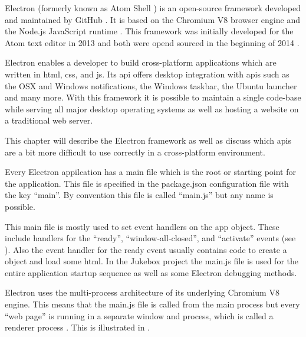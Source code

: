 

Electron (formerly known as Atom Shell \cite{atomShell}) is an open-source framework developed and maintained by GitHub \cite{electron}. It is based on the Chromium V8 browser engine \cite{chromium} and the Node.js JavaScript runtime \cite{nodejs}. This framework was initially developed for the Atom text editor \cite{atom} in 2013 and both were opend sourced in the beginning of 2014 \cite{aboutElectron}.

Electron enables a developer to build cross-platform applications which are written in \gls{html}, \gls{css}, and \gls{js}. Its \gls{api} offers desktop integration with \gls{api}s such as the OSX and Windows notifications, the Windows taskbar, the Ubuntu launcher and many more. With this framework it is possible to maintain a single code-base while serving all major desktop operating systems as well as hosting a website on a traditional web server.

This chapter will describe the Electron framework as well as discuss which \gls{api}s are a bit more difficult to use correctly in a cross-platform environment.


Every Electron appilcation has a main file which is the root or starting point for the application. This file is specified in the package.json configuration file with the key \enquote{main}. By convention this file is called \enquote{main.js} but any name is possible.


This main file is mostly used to set event handlers on the app object. These include handlers for the \enquote{ready}, \enquote{window-all-closed}, and \enquote{activate} events (see ). Also the event handler for the ready event usually contains code to create a  object and load some \gls{html}. In the Jukebox project the main.js file is used for the entire application startup sequence as well as some Electron debugging methods.


Electron uses the multi-process architecture of its underlying Chromium V8 engine. This means that the main.js file is called from the main process but every \enquote{web page} is running in a separate window and process, which is called a renderer process \cite{electronAppArch}. This is illustrated in .

